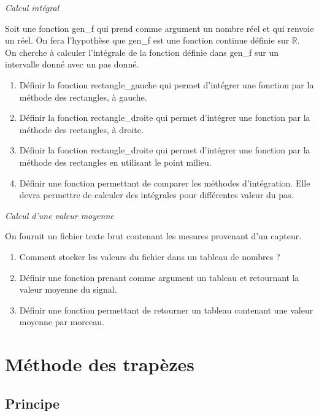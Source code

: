 \documentclass[11pt]{article}
\begin{document}
\begin{exemple}
\textit{Calcul intégral}

Soit une fonction \textsf{gen\_f} qui prend comme argument un nombre réel et qui renvoie un réel. On fera l'hypothèse que \textsf{gen\_f} est une fonction continue définie sur $\mathbb{R}$. On cherche à calculer l'intégrale de la fonction définie dans \textsf{gen\_f} sur un intervalle donné avec un pas donné. 

\begin{enumerate}
\item Définir la fonction \textsf{rectangle\_gauche} qui permet d'intégrer une fonction par la méthode des rectangles, à gauche.
\item Définir la fonction \textsf{rectangle\_droite} qui permet d'intégrer une fonction par la méthode des rectangles, à droite.
\item Définir la fonction \textsf{rectangle\_droite} qui permet d'intégrer une fonction par la méthode des rectangles en utilisant le point milieu.
\item Définir une fonction permettant de comparer les méthodes d'intégration. Elle devra permettre de calculer des intégrales pour différentes valeur du pas. 
\end{enumerate}
\end{exemple}

\begin{exemple}
\textit{Calcul d'une valeur moyenne}

On fournit un fichier texte brut contenant les mesures provenant d'un capteur. 
\begin{enumerate}
\item Comment stocker les valeurs du fichier dans un tableau de nombres ?
\item Définir une fonction prenant comme argument un tableau et retournant la valeur moyenne du signal. 
\item Définir une fonction permettant de retourner un tableau contenant une valeur moyenne par morceau.
\end{enumerate}

\end{exemple}

\newpage

\section{Méthode des trapèzes}
\subsection{Principe}
\end{document}
